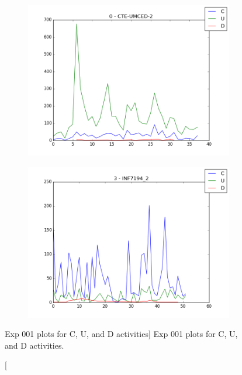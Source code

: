 \begin{figure}[h!]
    \centering

    \begin{subfigure}{.5\textwidth}
        \centering
        \includegraphics[width=\linewidth]{imgs/fig_0_CTE-UMCED-2_cud}
        \label{subfig:exp_001_0_cud}
    \end{subfigure}%
    \begin{subfigure}{.5\textwidth}
        \centering
        \includegraphics[width=\linewidth]{imgs/fig_3_INF7194_2_cud}
        \label{subfig:exp_001_3_cud}
    \end{subfigure}

    \caption
        [Exp 001 plots for C, U, and D activities]
        {Exp 001 plots for C, U, and D activities.}

    \label{fig:exp_001_cud}
\end{figure}
